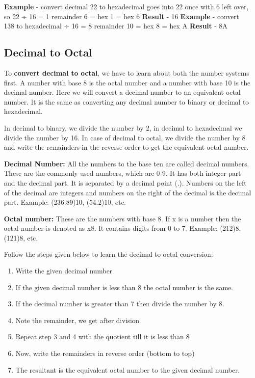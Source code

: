 \documentclass[pstricks,border=11pt]{article}
\begin{document}
\hfill \break
\textbf{Example} - convert decimal 22 to hexadecimal
\hfill {} goes into 22 once with 6 left over, so 22 ÷ 16 = 1 remainder 6
\hfill {} = hex 1
\hfill {} = hex 6
\hfill \break
\textbf{Result} - 16
\hfill \break
\textbf{Example} - convert 138 to hexadecimal
\hfill {} ÷ 16 = 8 remainder 10
\hfill {} = hex 8
\hfill {} = hex A
\hfill \break
\textbf{Result} - 8A
\hfill \break

\subsection{Decimal to Octal}

To \textbf{convert decimal to octal}, we have to learn about both the number systems first. A number with base 8 is the octal number and a number with base 10 is the decimal number. Here we will convert a decimal number to an equivalent octal number. It is the same as converting any decimal number to binary or decimal to hexadecimal.

\hfill \break
In decimal to binary, we divide the number by 2, in decimal to hexadecimal we divide the number by 16. In case of decimal to octal, we divide the number by 8 and write the remainders in the reverse order to get the equivalent octal number.

\hfill \break
\textbf{Decimal Number:} All the numbers to the base ten are called decimal numbers. These are the commonly used numbers, which are 0-9. It has both integer part and the decimal part. It is separated by a decimal point (.). Numbers on the left of the decimal are integers and numbers on the right of the decimal is the decimal part. Example: (236.89)10, (54.2)10, etc.

\hfill \break
\textbf{Octal number:} These are the numbers with base 8. If x is a number then the octal number is denoted as x8. It contains digits from 0 to 7. Example: (212)8, (121)8, etc.

\vspace{8mm}
\hfill \break
Follow the steps given below to learn the decimal to octal conversion:

\begin{enumerate}
    \item Write the given decimal number
    \item If the given decimal number is less than 8 the octal number is the same.
    \item If the decimal number is greater than 7 then divide the number by 8.
    \item Note the remainder, we get after division
    \item Repeat step 3 and 4 with the quotient till it is less than 8
    \item Now, write the remainders in reverse order (bottom to top)
    \item The resultant is the equivalent octal number to the given decimal number.
\end{enumerate}
\end{document}
